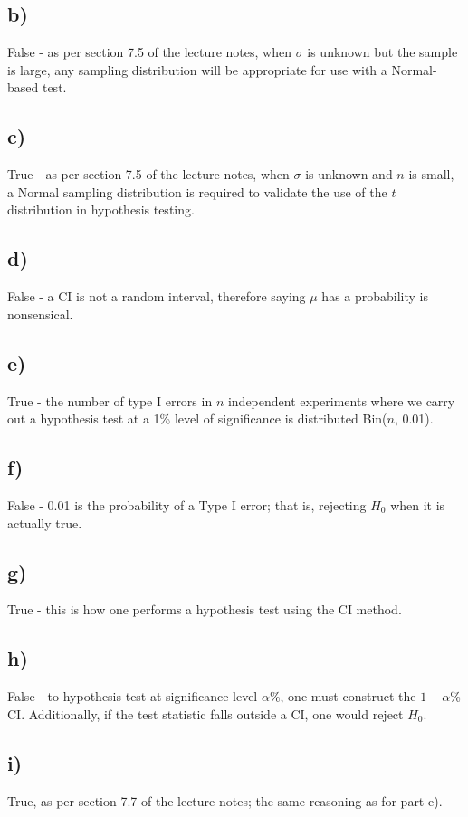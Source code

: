 \documentclass[]{article}
\begin{document}
\subsection{b)}
False - as per section 7.5 of the lecture notes, when $\sigma$ is unknown but the sample is large, any sampling distribution will be appropriate for use with a Normal-based test.

\subsection{c)}
True - as per section 7.5 of the lecture notes, when $\sigma$ is unknown and $n$ is small, a Normal sampling distribution is required to validate the use of the $t$ distribution in hypothesis testing.

\subsection{d)}
False - a CI is not a random interval, therefore saying $\mu$ has a probability is nonsensical.

\subsection{e)}
True - the number of type I errors in $n$ independent experiments where we carry out a
hypothesis test at a 1\% level of significance is distributed Bin($n$, 0.01).

\subsection{f)}
False - 0.01 is the probability of a Type I error; that is, rejecting $H_0$ when it is actually true.

\subsection{g)}
True - this is how one performs a hypothesis test using the CI method.

\subsection{h)}
False - to hypothesis test at significance level $\alpha$\%, one must construct the $1-\alpha$\% CI. Additionally, if the test statistic falls outside a CI, one would reject $H_0$.

\subsection{i)}
True, as per section 7.7 of the lecture notes; the same reasoning as for part e).
\end{document}
